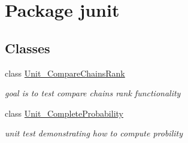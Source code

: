 \hypertarget{namespacejunit}{}\section{Package junit}
\label{namespacejunit}
\subsection*{Classes}
\begin{DoxyCompactItemize}
\item 
class \hyperlink{classjunit_1_1_unit___compare_chains_rank}{Unit\+\_\+\+Compare\+Chains\+Rank}
\begin{DoxyCompactList}\small\item\em goal is to test compare chains rank functionality \end{DoxyCompactList}\item 
class \hyperlink{classjunit_1_1_unit___complete_probability}{Unit\+\_\+\+Complete\+Probability}
\begin{DoxyCompactList}\small\item\em unit test demonstrating how to compute probility \end{DoxyCompactList}\end{DoxyCompactItemize}
